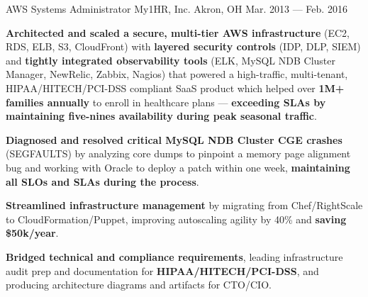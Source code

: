 \begin{cventries}
    \cventry
        { AWS Systems Administrator }
        { My1HR, Inc. }
        { Akron, OH }
        { Mar. 2013 --- Feb. 2016 }
        {
            \begin{cvitems}
                \item{\textbf{Architected and scaled a secure, multi-tier AWS infrastructure} (EC2, RDS, ELB, S3, CloudFront) with \textbf{layered security controls} (IDP, DLP, SIEM) and \textbf{tightly integrated observability tools} (ELK, MySQL NDB Cluster Manager, NewRelic, Zabbix, Nagios) that powered a high-traffic, multi-tenant, HIPAA/HITECH/PCI-DSS compliant SaaS product which helped over \textbf{1M+ families annually} to enroll in healthcare plans --- \textbf{exceeding SLAs by maintaining five-nines availability during peak seasonal traffic}.}
                \item{\textbf{Diagnosed and resolved critical MySQL NDB Cluster CGE crashes} (SEGFAULTS) by analyzing core dumps to pinpoint a memory page alignment bug and working with Oracle to deploy a patch within one week, \textbf{maintaining all SLOs and SLAs during the process}.}
                \item{\textbf{Streamlined infrastructure management} by migrating from Chef/RightScale to CloudFormation/Puppet, improving autoscaling agility by 40\% and \textbf{saving \$50k/year}.}
                \item{\textbf{Bridged technical and compliance requirements}, leading infrastructure audit prep and documentation for \textbf{HIPAA/HITECH/PCI-DSS}, and producing architecture diagrams and artifacts for CTO/CIO.}
            \end{cvitems}
        }
\end{cventries}

